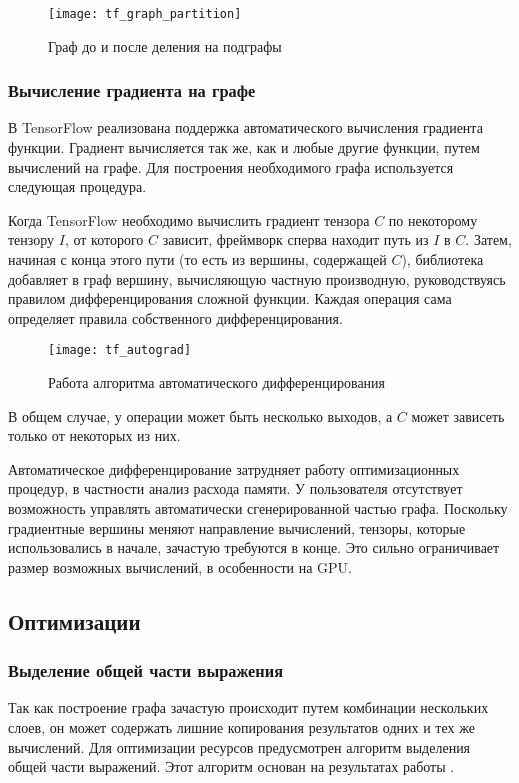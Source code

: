 \begin{figure}[h]
    \centering
    \texttt{[image: tf\_graph\_partition]}
    \caption{Граф до и после деления на подграфы}
    \label{fig:tf_graph_partition}
\end{figure}

\subsubsection{Вычисление градиента на графе}

В TensorFlow реализована поддержка автоматического вычисления градиента функции.
Градиент вычисляется так же, как и любые другие функции, путем вычислений на
графе. Для построения необходимого графа используется следующая процедура.

Когда TensorFlow необходимо вычислить градиент тензора $C$ по некоторому
тензору $I$, от которого $C$ зависит, фреймворк сперва находит путь из
$I$ в $C$. Затем, начиная с конца этого пути (то есть из вершины, содержащей $C$),
библиотека добавляет в граф вершину, вычисляющую частную производную,
руководствуясь правилом дифференцирования сложной функции. Каждая операция сама
определяет правила собственного дифференцирования.

\begin{figure}[h]
    \centering
    \texttt{[image: tf\_autograd]}
    \caption{Работа алгоритма автоматического дифференцирования}
    \label{fig:tf_autograd}
\end{figure}

В общем случае, у операции может быть несколько выходов, а $C$ может зависеть
только от некоторых из них.

Автоматическое дифференцирование затрудняет работу оптимизационных процедур,
в частности анализ расхода памяти. У пользователя отсутствует возможность
управлять автоматически сгенерированной частью графа. Поскольку градиентные
вершины меняют направление вычислений, тензоры, которые использовались в начале,
зачастую требуются в конце. Это сильно ограничивает размер возможных вычислений,
в особенности на GPU.


\subsection{Оптимизации}

\subsubsection{Выделение общей части выражения}
Так как построение графа зачастую происходит путем комбинации нескольких слоев,
он может содержать лишние копирования результатов одних и тех же вычислений.
Для оптимизации ресурсов предусмотрен алгоритм выделения общей части выражений.
Этот алгоритм основан на результатах работы \cite{click}.

